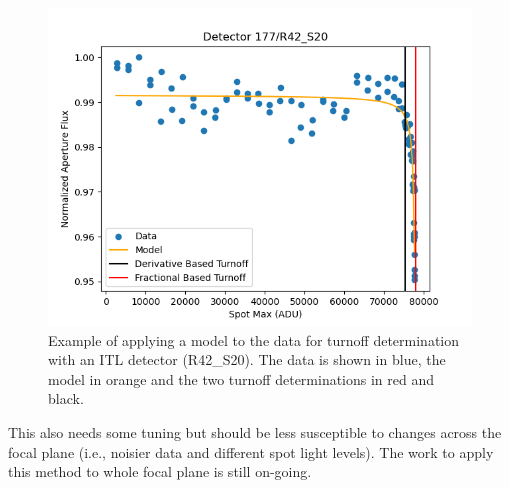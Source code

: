 \begin{figure}[ht]
    \centering
    \includegraphics[width=0.95\linewidth]{figures/Spot_Photometry_Model.png}
    \caption{Example of applying a model to the data for turnoff determination with an ITL detector (R42\_S20). The data is shown in blue, the model in orange and the two turnoff determinations in red and black.}
    \label{fig:Spot_Model}
\end{figure}

This also needs some tuning but should be less susceptible to changes across the focal plane (i.e., noisier data and different spot light levels). The work to apply this method to whole focal plane is still on-going.

\clearpage
